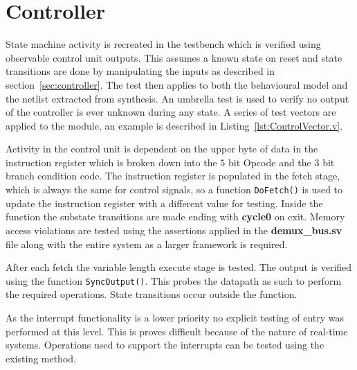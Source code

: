 
\section{Controller}

State machine activity is recreated in the testbench which is verified using observable control unit outputs.
This assumes a known state on reset and state transitions are done by manipulating the inputs as described in section~\ref{sec:controller}.  
The test then applies to both the behavioural model and the netlist extracted from synthesis.
An umbrella test is used to verify no output of the controller is ever unknown during any state.
A series of test vectors are applied to the module, an example is described in Listing~\ref{lst:ControlVector.v}.




Activity in the control unit is dependent on the upper byte of data in the instruction register which is broken down into the $5$ bit Opcode and the $3$ bit branch condition code.  
The instruction register is populated in the fetch stage, which is always the same for control signals, so a function \texttt{DoFetch()} is used to update the instruction register with a different value for testing.
Inside the function the substate transitions are made ending with \textbf{cycle0} on exit.
Memory access violations are tested using the assertions applied in the \textbf{demux\_bus.sv} file along with the entire system as a larger framework is required.

After each fetch the variable length execute stage is tested.
The output is verified using the function \texttt{SyncOutput()}. 
This probes the datapath as such to perform the required operations.
State transitions occur outside the function.

As the interrupt functionality is a lower priority no explicit testing of entry was performed at this level.
This is proves difficult because of the nature of real-time systems.
Operations used to support the interrupts can be tested using the existing method. 
